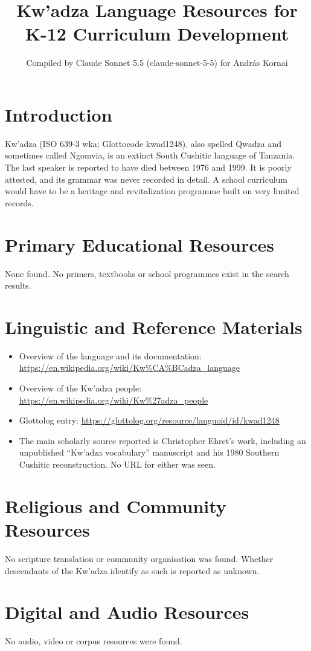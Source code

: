 \documentclass[12pt]{article}
\title{Kw'adza Language Resources for K-12 Curriculum Development}
\author{Compiled by Claude Sonnet 5.5 (claude-sonnet-5-5) for Andr\'as Kornai}
\date{}
\begin{document}
\maketitle

\section{Introduction}
Kw'adza (ISO 639-3 wka; Glottocode kwad1248), also spelled Qwadza and sometimes called Ngomvia, is an extinct South Cushitic language of Tanzania. The last speaker is reported to have died between 1976 and 1999. It is poorly attested, and its grammar was never recorded in detail. A school curriculum would have to be a heritage and revitalization programme built on very limited records.

\section{Primary Educational Resources}
None found. No primers, textbooks or school programmes exist in the search results.

\section{Linguistic and Reference Materials}
\begin{itemize}
\item Overview of the language and its documentation: \url{https://en.wikipedia.org/wiki/Kw%CA%BCadza_language}
\item Overview of the Kw'adza people: \url{https://en.wikipedia.org/wiki/Kw%27adza_people}
\item Glottolog entry: \url{https://glottolog.org/resource/languoid/id/kwad1248}
\item The main scholarly source reported is Christopher Ehret's work, including an unpublished ``Kw'adza vocabulary'' manuscript and his 1980 Southern Cushitic reconstruction. No URL for either was seen.
\end{itemize}

\section{Religious and Community Resources}
No scripture translation or community organisation was found. Whether descendants of the Kw'adza identify as such is reported as unknown.

\section{Digital and Audio Resources}
No audio, video or corpus resources were found.
\end{document}
